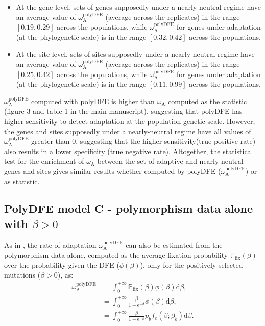 \documentclass{article}
\newcommand{\der}{\mathrm{d}}
\newcommand{\e}{\mathrm{e}}
\newcommand{\rateApop}{\omega_{\mathrm{A}}}
\newcommand{\proba}{\mathbb{P}}
\newcommand{\pfix}{\proba_{\mathrm{fix}}}
\newcommand{\Spop}{\beta}
\begin{document}
    \begin{itemize}
        \item At the gene level, sets of genes supposedly under a nearly-neutral regime have an average value of $\rateApop^{\mathrm{polyDFE}}$ (average across the replicates) in the range $[0.19,0.29]$ across the populations, while $\rateApop^{\mathrm{polyDFE}}$ for genes under adaptation (at the phylogenetic scale) is in the range $[0.32,0.42]$ across the populations.
        \item At the site level, sets of sites supposedly under a nearly-neutral regime have an average value of $\rateApop^{\mathrm{polyDFE}}$ (average across the replicates) in the range $[0.25,0.42]$ across the populations, while $\rateApop^{\mathrm{polyDFE}}$ for genes under adaptation (at the phylogenetic scale) is in the range $[0.11,0.99]$ across the populations.
    \end{itemize}
    $\rateApop^{\mathrm{polyDFE}}$ computed with polyDFE is higher than $\rateApop$ computed as the \textcite{mcdonald_adaptative_1991} statistic (figure 3 and table 1 in the main manuscript), suggesting that polyDFE has higher sensitivity to detect adaptation at the population-genetic scale.
    However, the genes and sites supposedly under a nearly-neutral regime have all values of $\rateApop^{\mathrm{polyDFE}}$ greater than 0, suggesting that the higher sensitivity(true positive rate) also results in a lower specificity (true negative rate).
    Altogether, the statistical test for the enrichment of $\rateApop$ between the set of adaptive and nearly-neutral genes and sites gives similar results whether computed by polyDFE ($\rateApop^{\mathrm{polyDFE}}$) or as \textcite{mcdonald_adaptative_1991} statistic.

    \pagebreak

    \subsection{PolyDFE model C - polymorphism data alone with $\Spop > 0$}
    As in \textcite{tataru_inference_2017}, the rate of adaptation $\rateApop^{\mathrm{polyDFE}}$ can also be estimated from the polymorphism data alone, computed as the average fixation probability $\pfix (\Spop)$ over the probability given the DFE ($\phi (\Spop)$), only for the positively selected mutations ($\Spop > 0$), as:
    \begin{align*}
        \rateApop^{\mathrm{polyDFE}} &= \int_{0}^{+\infty} \pfix (\Spop) \phi (\Spop) \der \Spop, \\
        &= \int_{0}^{+\infty} \frac{\Spop}{1 - \e^{-\Spop}} \phi (\Spop) \der \Spop, \\
        &= \int_{0}^{+\infty} \frac{\Spop}{1 - \e^{-\Spop}} p_b f_{e}(\Spop; \Spop_b) \der \Spop.
    \end{align*}
    
\end{document}
